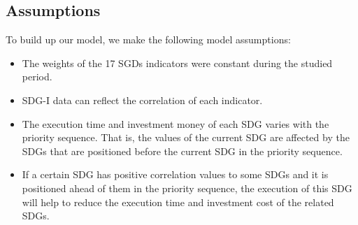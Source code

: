 \documentclass[10pt]{mcmthesis}
\begin{document}
\subsection{ Assumptions}
To build up our model, we make the following model assumptions:

\begin{itemize}
\item  The weights of the 17 SGDs indicators were constant during the studied period.  \\

\item SDG-I data\cite{pradhan2017systematic}  can reflect the correlation of each indicator. \\

\item The execution time and investment money of each SDG varies with the priority sequence. That is, the values of the current SDG are affected by the SDGs that are positioned before the current SDG in the priority sequence.  \\

\item If a certain SDG has positive correlation values to some SDGs and it is positioned ahead of them in the priority sequence, the execution of this SDG will help to reduce the execution time and investment cost of the related SDGs.  \\

\end{itemize}




\end{document}

